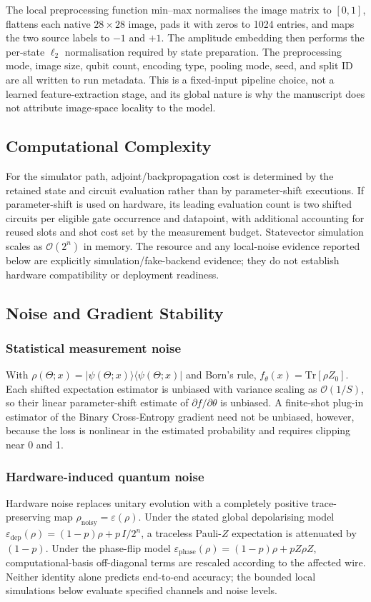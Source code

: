 \documentclass[conference]{IEEEtran}
\begin{document}
The local preprocessing function min--max normalises the image matrix to
$[0,1]$, flattens each native $28\times28$ image, pads it with zeros to 1024
entries, and maps the two source labels to $-1$ and $+1$. The amplitude embedding
then performs the per-state $\ell_2$ normalisation required by state preparation.
The preprocessing mode, image size, qubit count, encoding type, pooling mode,
seed, and split ID are all written to run metadata. This is a fixed-input
pipeline choice, not a learned feature-extraction stage, and its global nature
is why the manuscript does not attribute image-space locality to the model.

\subsection{Computational Complexity}
For the simulator path, adjoint/backpropagation cost is determined by the retained state and circuit evaluation rather than by parameter-shift executions. If parameter-shift is used on hardware, its leading evaluation count is two shifted circuits per eligible gate occurrence and datapoint, with additional accounting for reused slots and shot cost set by the measurement budget. Statevector simulation scales as $\mathcal{O}(2^n)$ in memory. The resource and any local-noise evidence reported below are explicitly simulation/fake-backend evidence; they do not establish hardware compatibility or deployment readiness.

\subsection{Noise and Gradient Stability}
\subsubsection{Statistical measurement noise}
With $\rho(\Theta; x) = |\psi(\Theta; x)\rangle\langle\psi(\Theta; x)|$ and Born's rule, $f_\theta(x) = \text{Tr}[\rho Z_0]$. Each shifted expectation estimator is unbiased with variance scaling as $\mathcal{O}(1/S)$, so their linear parameter-shift estimate of $\partial f/\partial\theta$ is unbiased. A finite-shot plug-in estimator of the Binary Cross-Entropy gradient need not be unbiased, however, because the loss is nonlinear in the estimated probability and requires clipping near 0 and 1.

\subsubsection{Hardware-induced quantum noise}
Hardware noise replaces unitary evolution with a completely positive trace-preserving map $\rho_{\text{noisy}} = \varepsilon(\rho)$. Under the stated global depolarising model $\varepsilon_{\text{dep}}(\rho) = (1 - p)\rho + p\, I/2^n$, a traceless Pauli-$Z$ expectation is attenuated by $(1-p)$. Under the phase-flip model $\varepsilon_{\text{phase}}(\rho) = (1 - p)\rho + p Z\rho Z$, computational-basis off-diagonal terms are rescaled according to the affected wire. Neither identity alone predicts end-to-end accuracy; the bounded local simulations below evaluate specified channels and noise levels.
\end{document}
